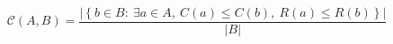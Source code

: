 \documentclass{article}
\begin{document}
\[
\mathcal{C}(A,B)=\frac{\left|\left\{b\in B:\ \exists a\in A,\ C(a)\leq C(b),\ R(a)\leq R(b)\right\}\right|}{|B|}
\]
\end{document}
